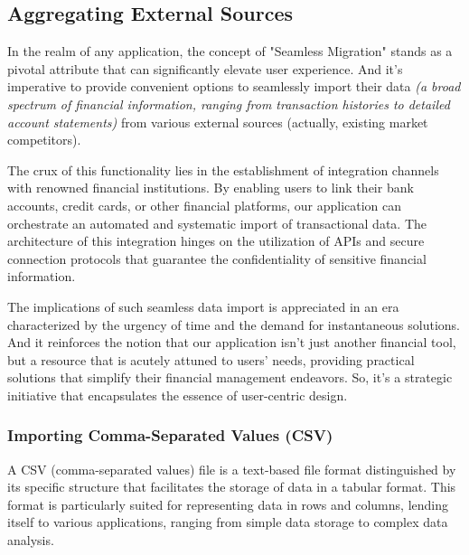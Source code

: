 
\subsection{Aggregating External Sources}

In the realm of any application, the concept of "Seamless Migration" stands as a pivotal attribute that can 
significantly elevate user experience. And it's imperative to provide convenient options to seamlessly import their 
data \emph{(a broad spectrum of financial information, ranging from transaction histories to detailed account 
statements)} from various external sources (actually, existing market competitors).

The crux of this functionality lies in the establishment of integration channels with renowned financial institutions. 
By enabling users to link their bank accounts, credit cards, or other financial platforms, our application can 
orchestrate an automated and systematic import of transactional data. The architecture of this integration hinges 
on the utilization of APIs and secure connection protocols that guarantee the confidentiality of sensitive financial 
information.

The implications of such seamless data import is appreciated in an era characterized by the urgency of time and the 
demand for instantaneous solutions. And it reinforces the notion that our application isn't just another financial 
tool, but a resource that is acutely attuned to users' needs, providing practical solutions that simplify their 
financial management endeavors. So, it's a strategic initiative that encapsulates the essence of user-centric design. 


\subsubsection{Importing Comma-Separated Values (CSV)}

A CSV (comma-separated values) file is a text-based file format distinguished by its specific structure that facilitates 
the storage of data in a tabular format. This format is particularly suited for representing data in rows and columns, 
lending itself to various applications, ranging from simple data storage to complex data analysis.

